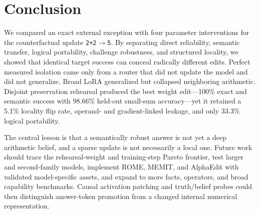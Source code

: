 \section{Conclusion}
\label{sec:conclusion}

We compared an exact external exception with four parameter interventions for the counterfactual update \texttt{2+2}$\rightarrow$\texttt{5}. By separating direct reliability, semantic transfer, logical portability, challenge robustness, and structured locality, we showed that identical target success can conceal radically different edits. Perfect measured isolation came only from a router that did not update the model and did not generalize. Broad LoRA generalized but collapsed neighboring arithmetic. Disjoint preservation rehearsal produced the best weight edit---100\% exact and semantic success with 98.66\% held-out small-sum accuracy---yet it retained a 5.1\% locality flip rate, operand- and gradient-linked leakage, and only 33.3\% logical portability.

The central lesson is that a semantically robust answer is not yet a deep arithmetic belief, and a sparse update is not necessarily a local one. Future work should trace the rehearsal-weight and training-step Pareto frontier, test larger and second-family models, implement ROME, MEMIT, and AlphaEdit with validated model-specific assets, and expand to more facts, operators, and broad capability benchmarks. Causal activation patching and truth/belief probes could then distinguish answer-token promotion from a changed internal numerical representation.
